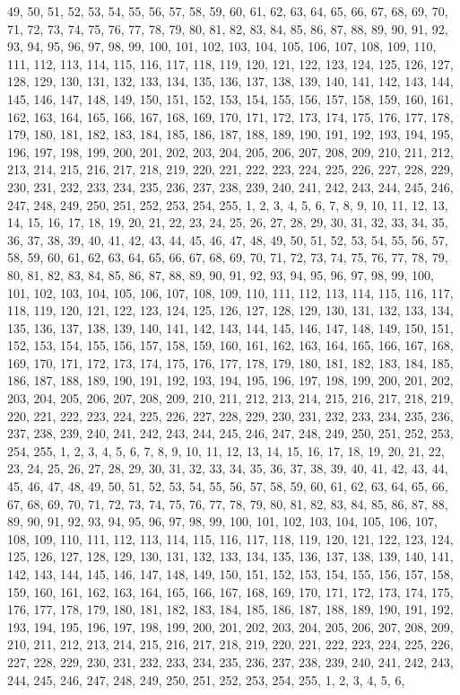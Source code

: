 49, 50, 51, 52, 53, 54, 55, 56, 57, 58, 59, 60, 61, 62, 63, 64, 65, 66, 67, 68, 69, 70, 71, 72, 73, 74, 75, 76, 77, 78, 79, 80, 81, 82, 83, 84, 85, 86, 87, 88, 89, 90, 91, 92, 93, 94, 95, 96, 97, 98, 99, 100, 101, 102, 103, 104, 105, 106, 107, 108, 109, 110, 111, 112, 113, 114, 115, 116, 117, 118, 119, 120, 121, 122, 123, 124, 125, 126, 127, 128, 129, 130, 131, 132, 133, 134, 135, 136, 137, 138, 139, 140, 141, 142, 143, 144, 145, 146, 147, 148, 149, 150, 151, 152, 153, 154, 155, 156, 157, 158, 159, 160, 161, 162, 163, 164, 165, 166, 167, 168, 169, 170, 171, 172, 173, 174, 175, 176, 177, 178, 179, 180, 181, 182, 183, 184, 185, 186, 187, 188, 189, 190, 191, 192, 193, 194, 195, 196, 197, 198, 199, 200, 201, 202, 203, 204, 205, 206, 207, 208, 209, 210, 211, 212, 213, 214, 215, 216, 217, 218, 219, 220, 221, 222, 223, 224, 225, 226, 227, 228, 229, 230, 231, 232, 233, 234, 235, 236, 237, 238, 239, 240, 241, 242, 243, 244, 245, 246, 247, 248, 249, 250, 251, 252, 253, 254, 255, 1, 2, 3, 4, 5, 6, 7, 8, 9, 10, 11, 12, 13, 14, 15, 16, 17, 18, 19, 20, 21, 22, 23, 24, 25, 26, 27, 28, 29, 30, 31, 32, 33, 34, 35, 36, 37, 38, 39, 40, 41, 42, 43, 44, 45, 46, 47, 48, 49, 50, 51, 52, 53, 54, 55, 56, 57, 58, 59, 60, 61, 62, 63, 64, 65, 66, 67, 68, 69, 70, 71, 72, 73, 74, 75, 76, 77, 78, 79, 80, 81, 82, 83, 84, 85, 86, 87, 88, 89, 90, 91, 92, 93, 94, 95, 96, 97, 98, 99, 100, 101, 102, 103, 104, 105, 106, 107, 108, 109, 110, 111, 112, 113, 114, 115, 116, 117, 118, 119, 120, 121, 122, 123, 124, 125, 126, 127, 128, 129, 130, 131, 132, 133, 134, 135, 136, 137, 138, 139, 140, 141, 142, 143, 144, 145, 146, 147, 148, 149, 150, 151, 152, 153, 154, 155, 156, 157, 158, 159, 160, 161, 162, 163, 164, 165, 166, 167, 168, 169, 170, 171, 172, 173, 174, 175, 176, 177, 178, 179, 180, 181, 182, 183, 184, 185, 186, 187, 188, 189, 190, 191, 192, 193, 194, 195, 196, 197, 198, 199, 200, 201, 202, 203, 204, 205, 206, 207, 208, 209, 210, 211, 212, 213, 214, 215, 216, 217, 218, 219, 220, 221, 222, 223, 224, 225, 226, 227, 228, 229, 230, 231, 232, 233, 234, 235, 236, 237, 238, 239, 240, 241, 242, 243, 244, 245, 246, 247, 248, 249, 250, 251, 252, 253, 254, 255, 1, 2, 3, 4, 5, 6, 7, 8, 9, 10, 11, 12, 13, 14, 15, 16, 17, 18, 19, 20, 21, 22, 23, 24, 25, 26, 27, 28, 29, 30, 31, 32, 33, 34, 35, 36, 37, 38, 39, 40, 41, 42, 43, 44, 45, 46, 47, 48, 49, 50, 51, 52, 53, 54, 55, 56, 57, 58, 59, 60, 61, 62, 63, 64, 65, 66, 67, 68, 69, 70, 71, 72, 73, 74, 75, 76, 77, 78, 79, 80, 81, 82, 83, 84, 85, 86, 87, 88, 89, 90, 91, 92, 93, 94, 95, 96, 97, 98, 99, 100, 101, 102, 103, 104, 105, 106, 107, 108, 109, 110, 111, 112, 113, 114, 115, 116, 117, 118, 119, 120, 121, 122, 123, 124, 125, 126, 127, 128, 129, 130, 131, 132, 133, 134, 135, 136, 137, 138, 139, 140, 141, 142, 143, 144, 145, 146, 147, 148, 149, 150, 151, 152, 153, 154, 155, 156, 157, 158, 159, 160, 161, 162, 163, 164, 165, 166, 167, 168, 169, 170, 171, 172, 173, 174, 175, 176, 177, 178, 179, 180, 181, 182, 183, 184, 185, 186, 187, 188, 189, 190, 191, 192, 193, 194, 195, 196, 197, 198, 199, 200, 201, 202, 203, 204, 205, 206, 207, 208, 209, 210, 211, 212, 213, 214, 215, 216, 217, 218, 219, 220, 221, 222, 223, 224, 225, 226, 227, 228, 229, 230, 231, 232, 233, 234, 235, 236, 237, 238, 239, 240, 241, 242, 243, 244, 245, 246, 247, 248, 249, 250, 251, 252, 253, 254, 255, 1, 2, 3, 4, 5, 6, 